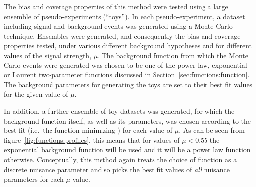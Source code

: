 The bias and coverage properties of this method were tested
using a large ensemble of
pseudo-experiments (``toys''). In each pseudo-experiment, a
dataset including signal and background events was generated using a Monte Carlo technique.
Ensembles were generated, and consequently the bias and coverage properties tested, under various different background hypotheses and for different values of the signal strength, $\mu$. The background function from which the Monte Carlo events were generated was chosen to be one of the power law,
exponential or Laurent two-parameter functions discussed in
Section~\ref{sec:functions:function}. The background parameters for generating the toys are set to their best fit values for the given value of $\mu$.

In addition, a further ensemble of toy datasets was generated, for which the background function itself, as well
as its parameters, was chosen according to the best fit (i.e.~the function minimizing \nll) for each value of $\mu$. 
As can be seen from figure~\ref{fig:functions:profiles}, this means that for values of $\mu < 0.55$ the exponential background
function will be used and it will be a power law function otherwise.
Conceptually, this method again
treats the choice of function as a discrete nuisance parameter and so picks the
best fit values of {\em all\/} nuisance parameters for each $\mu$ value.

